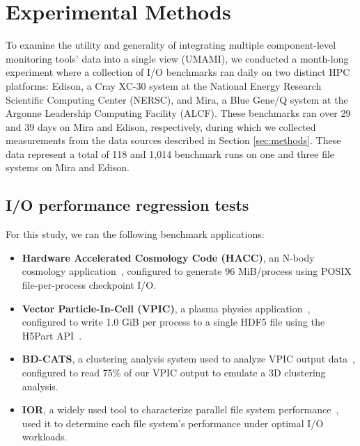 

\section{Experimental Methods} \label{sec:platforms}

To examine the utility and generality of integrating multiple component-level monitoring tools' data into a single view (UMAMI), we conducted a month-long experiment where a collection of I/O benchmarks ran daily on two distinct HPC platforms:
Edison, a Cray XC-30 system at the National Energy Research Scientific Computing Center (NERSC), and Mira, a Blue Gene/Q system at the Argonne Leadership Computing Facility (ALCF).
These benchmarks ran over 29 and 39 days on Mira and Edison, respectively, during which we collected measurements from the data sources described in Section \ref{sec:methods}.  These data represent a total of 118 and 1,014 benchmark runs on one and three file systems on Mira and Edison.

\subsection{I/O performance regression tests} \label{sec:methods/tests}

\noindent
For this study, we ran the following benchmark applications:

\begin{itemize}[leftmargin=*]
\item 
\textbf{Hardware Accelerated Cosmology Code (HACC)}, an N-body cosmology application~\cite{habib2012}, configured to generate 96 MiB/process using POSIX file-per-process checkpoint I/O.
 \item
\textbf{Vector Particle-In-Cell (VPIC)}, a plasma physics application~\cite{Bowers2008}, configured to write 1.0 GiB per process to a single HDF5 file using the H5Part API~\cite{H5Part}.
 \item
\textbf{BD-CATS}, a clustering analysis system used to analyze VPIC output data~\cite{Patwary2015},  configured to read 75\% of our VPIC output to emulate a 3D clustering analysis.
 \item
\textbf{IOR}, a widely used tool to characterize parallel file system performance~\cite{Yildiz2016,Xie2012,Lofstead2010,Uselton2010}, used it to determine each file system's performance under optimal I/O workloads.
 \end{itemize}

